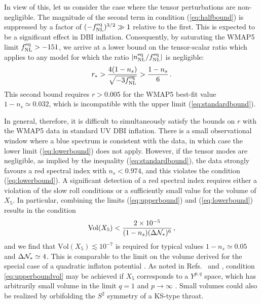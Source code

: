 In view of this, let us consider the case where the tensor 
perturbations are non-negligible. 
The magnitude of the second term in condition (\ref{eq:halfbound}) 
is suppressed by a factor of $(-f_{\mathrm{NL}}^{\mathrm{eq}})^{3/2} \gg 1$ 
relative to the first. This is expected to 
be a significant effect in DBI inflation. 
Consequently, 
by saturating the WMAP5 limit $f_{\mathrm{NL}}^{\mathrm{eq}} > -151$, we arrive at 
a lower bound on the tensor-scalar ratio which applies   
to any model for which the ratio $|n_{\mathrm{NL}}^{\mathrm{eq}}/f_{\mathrm{NL}}^{\mathrm{eq}}|$ is 
negligible:
% 
\begin{equation}
\label{eq:lowerbound}
r_* >  \frac{4(1-n_s)}{\sqrt{-3f_{\mathrm{NL}}^{\mathrm{eq}}}} > \frac{1-n_s}{6} \,.
\end{equation}
% 
This second bound requires $r > 0.005$ for the WMAP5 best-fit value 
$1-n_s \simeq 0.032$, which is incompatible with the upper limit 
(\ref{eq:standardbound}). 


In general, therefore, it is difficult to simultaneously satisfy 
the bounds on $r$ with the WMAP5 data
in standard UV DBI inflation. There is a 
small observational window where a blue spectrum is consistent 
with the data, in which case the lower limit 
(\ref{eq:lowerbound}) does not apply. 
However, if the tensor modes are negligible,
as implied by the inequality (\ref{eq:standardbound}), the 
data strongly favours a red spectral index with $n_s < 0.974$,
and this violates the condition (\ref{eq:lowerbound}). A significant 
detection of a red spectral index requires either a 
violation of the slow roll conditions or a sufficiently 
small value for the volume of $X_5$. 
In particular, combining the limits
(\ref{eq:upperbound}) and (\ref{eq:lowerbound}) results in the condition 
% 
\begin{equation}
\label{eq:upperboundvol}
\mathrm{Vol}(X_5) < \frac{2 \times 10^{-5}}{(1-n_s) 
(\Delta \mathcal{N}_{*} )^6}  \,,
\end{equation}
% 
and we find that $\mathrm{Vol}(X_5) \lesssim 10^{-7}$ 
is required for typical values $1-n_s \simeq 0.05$ and 
$\Delta \mathcal{N}_* \simeq 4$. 
This 
is comparable to the limit on the volume derived for the special case of a 
quadratic inflaton potential \cite{bmpaper}.  
As noted in Refs.~\cite{bmpaper} and \cite{bean}, condition 
\eqref{eq:upperboundvol} may be achieved 
if $X_5$ corresponds to a $Y^{p,q}$ space, 
which has arbitrarily small volume in the limit  
$q =1$ and $p \rightarrow \infty$ \cite{gauntlett}. 
Small volumes could also be realized 
by orbifolding the $S^2$ symmetry of a KS-type throat. 


